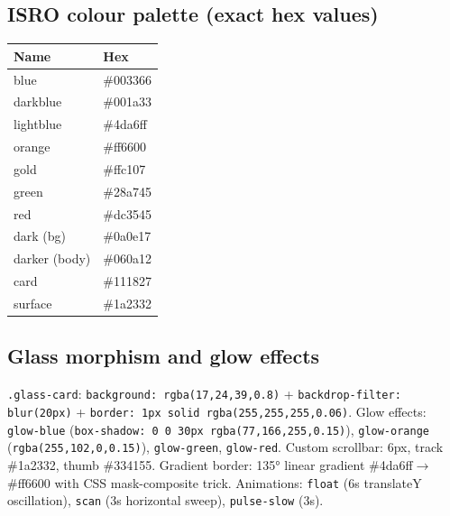 \documentclass[11pt,a4paper]{article}
\newcommand{\code}[1]{\texttt{\small #1}}
\begin{document}
\subsection*{ISRO colour palette (exact hex values)}
\begin{center}
\begin{tabular}{@{}ll@{}}
\toprule
\textbf{Name} & \textbf{Hex}\\
\midrule
blue & \#003366\\
darkblue & \#001a33\\
lightblue & \#4da6ff\\
orange & \#ff6600\\
gold & \#ffc107\\
green & \#28a745\\
red & \#dc3545\\
dark (bg) & \#0a0e17\\
darker (body) & \#060a12\\
card & \#111827\\
surface & \#1a2332\\
\bottomrule
\end{tabular}
\end{center}

\subsection*{Glass morphism and glow effects}
\code{.glass-card}: \code{background: rgba(17,24,39,0.8)} + \code{backdrop-filter: blur(20px)}
+ \code{border: 1px solid rgba(255,255,255,0.06)}. Glow effects: \code{glow-blue}
(\texttt{box-shadow: 0 0 30px rgba(77,166,255,0.15)}), \code{glow-orange}
(\texttt{rgba(255,102,0,0.15)}), \code{glow-green}, \code{glow-red}. Custom scrollbar: 6px,
track \#1a2332, thumb \#334155. Gradient border: 135° linear gradient \#4da6ff$\rightarrow$\#ff6600
with CSS mask-composite trick. Animations: \code{float} (6s translateY oscillation),
\code{scan} (3s horizontal sweep), \code{pulse-slow} (3s).
\end{document}
